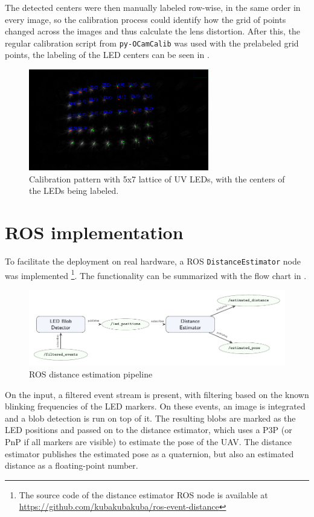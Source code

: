 \newpage

The detected centers were then manually labeled row-wise, in the same order in every image, so the calibration process could identify
how the grid of points changed across the images and thus calculate the lens distortion.
After this, the regular calibration script from \texttt{py-OCamCalib} was used with the prelabeled grid points, the labeling of the LED
centers can be seen in .

\begin{figure}[H]
  \centering
  \includegraphics[width=0.7\textwidth]{./fig/photos/lattice_blobs.png}
  \caption{Calibration pattern with 5x7 lattice of UV LEDs, with the centers of the LEDs being labeled.}
  \label{fig:calibration_pattern_labeled}
\end{figure}

\section{ROS implementation}
To facilitate the deployment on real hardware, a \ac{ROS} \texttt{DistanceEstimator} node was implemented
\footnote{The source code of the distance estimator \ac{ROS} node is available at \url{https://github.com/kubakubakuba/ros-event-distance}}.
The functionality can be summarized with the flow chart
in
.
\begin{figure}[H]
	\centering
	\includegraphics[width=1.0\textwidth]{./fig/tikz/rosflow.pdf}
	\caption{ROS distance estimation pipeline}
	\label{fig:rosflow}
\end{figure}
On the input, a filtered event stream is present, with filtering based on the known blinking frequencies of the \ac{LED} markers.
On these events, an image is integrated and a blob detection is run on top of it. The resulting blobs are marked as the \ac{LED} positions and passed 
on to the distance estimator, which uses a \ac{P3P} (or \ac{PnP} if all markers are visible) to estimate the pose of the \ac{UAV}. The distance estimator publishes the estimated pose as a quaternion, but also an estimated distance as a floating-point number.

